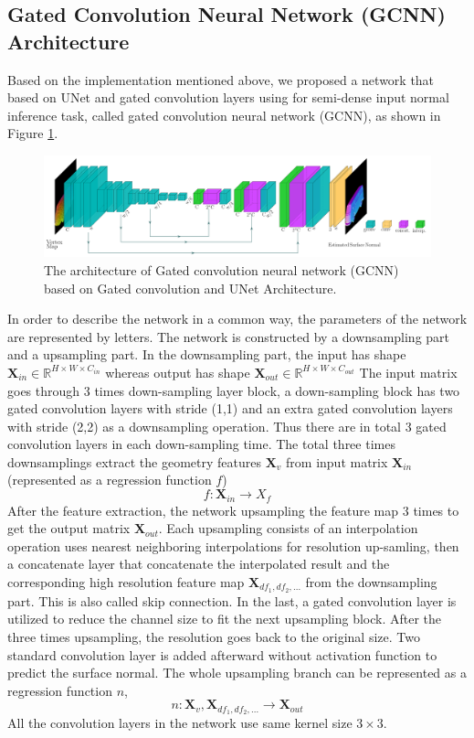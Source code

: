 \subsection{Gated Convolution Neural Network (GCNN) Architecture}
\label{sec:architecture}

Based on the implementation mentioned above, we proposed a network that based on UNet \cite{unet} and gated convolution layers using for semi-dense input normal inference task, called gated convolution neural network (GCNN), as shown in Figure \ref{fig:gcnn-archi}. 


\begin{figure}
	\centering
	\includegraphics[width=1\textwidth]{Figures/gcnn}
	\caption{The architecture of Gated convolution neural network (GCNN) based on Gated convolution and UNet Architecture.}
	\label{fig:gcnn-archi}
\end{figure}

In order to describe the network in a common way, the parameters of the network are represented by letters.
The network is constructed by a downsampling part and a upsampling part. In the downsampling part, the input has shape $ \textbf{X}_{in} \in \mathbb{R}^{H\times W\times C_{in}}$ whereas output has shape $ \textbf{X}_{out} \in \mathbb{R}^{H\times W\times C_{out}}$
The input matrix goes through 3 times down-sampling layer block, a down-sampling block has two gated convolution layers with stride (1,1) and an extra gated convolution layers with stride (2,2) as a downsampling operation. Thus there are in total 3 gated convolution layers in each down-sampling time.
The total three times downsamplings extract the geometry features $ \textbf{X}_v $ from input matrix $ \textbf{X}_{in} $ (represented as a regression function $ f $)
\[ f: \textbf{X}_{in} \rightarrow X_f \]
After the feature extraction, the network upsampling the feature map 3 times to get the output matrix $ \textbf{X}_{out} $. Each upsampling consists of an interpolation operation uses nearest neighboring interpolations for resolution up-samling, then a concatenate layer that concatenate the interpolated result and the corresponding high resolution feature map  $ \textbf{X}_{df_1, df_2, ...} $  from the downsampling part. This is also called skip connection. In the last, a gated convolution layer is utilized to reduce the channel size to fit the next upsampling block. After the three times upsampling, the resolution goes back to the original size. Two standard convolution layer is added afterward without activation function to predict the surface normal. The whole upsampling branch can be represented as a regression function $ n $,
\[ n: \textbf{X}_v, \textbf{X}_{df_1, df_2, ...} \rightarrow \textbf{X}_{out} \]
All the convolution layers in the network use same kernel size $ 3\times 3 $. 

